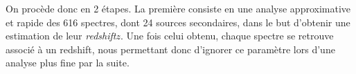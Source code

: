 \documentclass[12pt, a4paper]{article}
\begin{document}
On procède donc en 2 étapes. La première consiste en une analyse approximative et rapide des 616 spectres, dont 24 sources secondaires, dans le but d'obtenir une estimation de leur \textit{redshift}$z$. Une fois celui obtenu, chaque spectre se retrouve associé à un redshift, nous permettant donc d'ignorer ce paramètre lors d'une analyse plus fine par la suite.


\newpage

\printnoidxglossaries

\newpage

\printbibliography %
\end{document}
